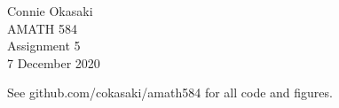 \documentclass[letter, 12pt]{article}
\begin{document}
\parindent=0in
\newenvironment{problem}[1][]
   {\begin{framed} \textbf{Problem \theprobnum: #1}}
   {\end{framed}\stepcounter{probnum}}
\newenvironment{bookproblem}[1]
   {\begin{framed} \textbf{Problem #1:}}
   {\end{framed}\stepcounter{probnum}}

\begin{flushright}
Connie Okasaki \\
AMATH 584\\
Assignment 5\\
7 December 2020
\end{flushright}

See github.com/cokasaki/amath584 for all code and figures.
\end{document}
